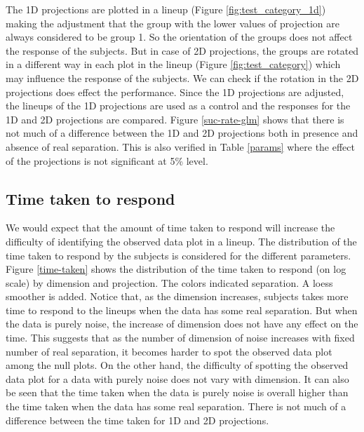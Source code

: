 The 1D projections are plotted in a lineup (Figure \ref{fig:test_category_1d}) making the adjustment that the group with the lower values of projection are always considered to be group 1. So the orientation of the groups does not affect the response of the subjects. But in case of 2D projections, the groups are rotated in a different way in each plot in the lineup (Figure \ref{fig:test_category}) which may influence the response of the subjects. We can check if the rotation in the 2D projections does effect the performance. Since the 1D projections are adjusted, the lineups of the 1D projections are used as a control and the responses for the 1D and 2D projections are compared. Figure \ref{suc-rate-glm} shows that there is not much of a difference between the 1D and 2D projections both in presence and absence of real separation. This is also verified in Table \ref{params} where the effect of the projections is not significant at 5\% level.  


\subsection{Time taken to respond}

We would expect that the amount of time taken to respond will increase the difficulty of identifying the observed data plot in a lineup. The distribution of the time taken to respond by the subjects is considered for the different parameters. Figure \ref{time-taken} shows the distribution of the time taken to respond (on log scale) by dimension and projection. The colors indicated separation. A loess smoother is added. Notice that, as the dimension increases, subjects  takes more time to respond to the lineups when the data has some real separation. But when the data is purely noise, the increase of dimension does not have any effect on the time. This suggests that as the number of dimension of noise increases with fixed number of real separation, it becomes harder to spot the observed data plot among the null plots. On the other hand, the difficulty of spotting the observed data plot for a data with purely noise does not vary with dimension. It can also be seen that the time taken when the data is purely noise is overall higher than the time taken when the data has some real separation. There is not much of a difference between the time taken for 1D and 2D projections.



